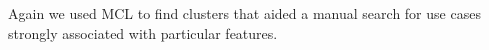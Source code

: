 Again we used MCL to find clusters that aided a manual search for use cases strongly associated with particular features.











